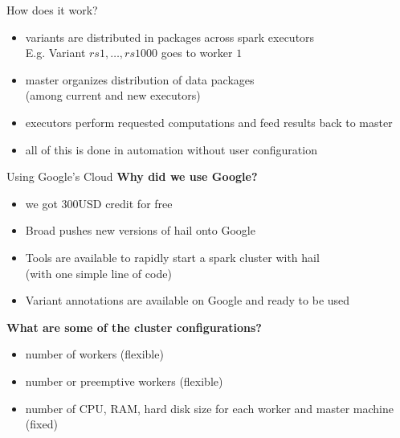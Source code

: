 \documentclass{beamer}
\begin{document}
\begin{frame}{How does it work?}
  \begin{itemize}
    \item variants are distributed in packages across spark executors \\
          E.g. Variant $rs1, \ldots, rs1000$ goes to worker $1$
    \item master organizes distribution of data packages \\
          (among current and new executors)
    \item executors perform requested computations and feed results back to master
    \item all of this is done in automation without user configuration
  \end{itemize}
\end{frame}

\begin{frame}{Using Google's Cloud}
  \textbf{Why did we use Google?}
  \begin{itemize}
    \item we got 300USD credit for free
    \item Broad pushes new versions of hail onto Google
    \item Tools are available to rapidly start a spark cluster with hail \\
          (with one simple line of code)
    \item Variant annotations are available on Google and ready to be used
  \end{itemize}
  \textbf{What are some of the cluster configurations?}
  \begin{itemize}
    \item number of workers (flexible)
    \item number or preemptive workers (flexible)
    \item number of CPU, RAM, hard disk size for each worker and master machine (fixed)
  \end{itemize}
\end{frame}
\end{document}

